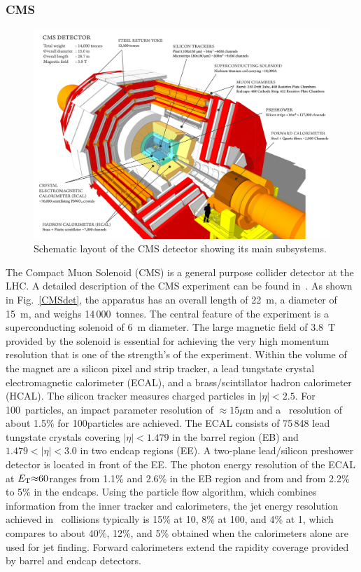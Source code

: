 \subsubsection{CMS}

\begin{figure}
\begin{center}
\includegraphics[height=0.49\textwidth]{introduction_figs/cms_120918_03.png}
\caption{Schematic layout of the CMS detector showing its main subsystems.}
\label{ntroduction_figs:CMSdet}
\end{center}
\end{figure}
The Compact Muon Solenoid (CMS) is a general purpose collider detector at the LHC. A detailed description of the CMS experiment
can be found in~\cite{Chatrchyan:2008zzk}.
As shown in Fig.~\ref{CMSdet},  the apparatus has an overall length of 22~m, a diameter of 15~m, and weighs 14\,000~tonnes.
The central feature of the experiment is a superconducting solenoid
of 6~m diameter. The large magnetic field of 3.8~T provided by the solenoid is essential for achieving
the very high momentum resolution that is one of the strength's of the experiment.
Within the volume of the magnet are a silicon pixel and strip tracker, a lead tungstate crystal
electromagnetic calorimeter (ECAL), and a brass/scintillator hadron calorimeter (HCAL).
The silicon tracker measures charged particles in $|\eta|< 2.5$.
For 100\GeVc\ particles, an impact parameter resolution of $\approx 15\mu$m and a \pT\
resolution of about 1.5\% for 100\GeV [100\GeVc] particles are achieved.
The ECAL consists of 75\,848 lead tungstate crystals covering $|\eta|< 1.479 $ in the
barrel region (EB) and $1.479 < |\eta| < 3.0$ in two endcap regions (EE).
A two-plane lead/silicon preshower detector is located  in front of the EE.
The photon energy resolution of the ECAL at  $E_{\rm T} {\approx} 60$\GeV ranges from
 1.1\% and 2.6\% in the EB region and from and from 2.2\% to 5\% in the
endcaps.
Using the particle flow algorithm, which combines information from the inner tracker
and calorimeters, the jet energy resolution achieved in \pp\ collisions typically
is 15\% at 10\GeV, 8\% at 100\GeV, and 4\% at 1\TeV,
which compares to about 40\%, 12\%, and 5\% obtained when the calorimeters alone
are used for jet finding.
Forward calorimeters extend the rapidity coverage provided by barrel and endcap detectors.

